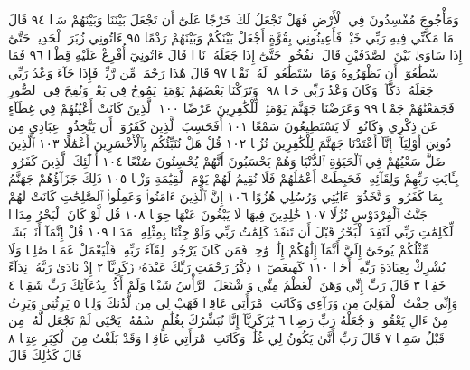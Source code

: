 وَمَأْجُوجَ مُفْسِدُونَ فِي ٱلْأَرْضِ فَهَلْ نَجْعَلُ لَكَ خَرْجًا عَلَىٰٓ أَن
تَجْعَلَ بَيْنَنَا وَبَيْنَهُمْ سَدࣰّا ٩٤ قَالَ مَا مَكَّنِّي فِيهِ رَبِّي خَيْرࣱ فَأَعِينُونِي
بِقُوَّةٍ أَجْعَلْ بَيْنَكُمْ وَبَيْنَهُمْ رَدْمًا ٩٥ ءَاتُونِي زُبَرَ ٱلْحَدِيدِۖ حَتَّىٰٓ إِذَا سَاوَىٰ
بَيْنَ ٱلصَّدَفَيْنِ قَالَ ٱنفُخُوا۟ۖ حَتَّىٰٓ إِذَا جَعَلَهُۥ نَارࣰا قَالَ ءَاتُونِيٓ أُفْرِغْ عَلَيْهِ
قِطْرࣰا ٩٦ فَمَا ٱسْطَٰعُوٓا۟ أَن يَظْهَرُوهُ وَمَا ٱسْتَطَٰعُوا۟ لَهُۥ نَقْبࣰا ٩٧
قَالَ هَٰذَا رَحْمَةࣱ مِّن رَّبِّيۖ فَإِذَا جَآءَ وَعْدُ رَبِّي جَعَلَهُۥ دَكَّآءَۖ وَكَانَ وَعْدُ رَبِّي
حَقࣰّا ٩٨۞ وَتَرَكْنَا بَعْضَهُمْ يَوْمَئِذࣲ يَمُوجُ فِي بَعْضࣲۖ وَنُفِخَ فِي ٱلصُّورِ
فَجَمَعْنَٰهُمْ جَمْعࣰا ٩٩ وَعَرَضْنَا جَهَنَّمَ يَوْمَئِذࣲ لِّلْكَٰفِرِينَ عَرْضًا ١٠٠ ٱلَّذِينَ
كَانَتْ أَعْيُنُهُمْ فِي غِطَآءٍ عَن ذِكْرِي وَكَانُوا۟ لَا يَسْتَطِيعُونَ سَمْعًا ١٠١
أَفَحَسِبَ ٱلَّذِينَ كَفَرُوٓا۟ أَن يَتَّخِذُوا۟ عِبَادِي مِن دُونِيٓ أَوْلِيَآءَۚ إِنَّآ
أَعْتَدْنَا جَهَنَّمَ لِلْكَٰفِرِينَ نُزُلࣰا ١٠٢ قُلْ هَلْ نُنَبِّئُكُم بِٱلْأَخْسَرِينَ أَعْمَٰلًا ١٠٣
ٱلَّذِينَ ضَلَّ سَعْيُهُمْ فِي ٱلْحَيَوٰةِ ٱلدُّنْيَا وَهُمْ يَحْسَبُونَ أَنَّهُمْ يُحْسِنُونَ
صُنْعًا ١٠٤ أُو۟لَٰٓئِكَ ٱلَّذِينَ كَفَرُوا۟ بِـَٔايَٰتِ رَبِّهِمْ وَلِقَآئِهِۦ فَحَبِطَتْ
أَعْمَٰلُهُمْ فَلَا نُقِيمُ لَهُمْ يَوْمَ ٱلْقِيَٰمَةِ وَزْنࣰا ١٠٥ ذَٰلِكَ جَزَآؤُهُمْ جَهَنَّمُ
بِمَا كَفَرُوا۟ وَٱتَّخَذُوٓا۟ ءَايَٰتِي وَرُسُلِي هُزُوًا ١٠٦ إِنَّ ٱلَّذِينَ ءَامَنُوا۟ وَعَمِلُوا۟
ٱلصَّٰلِحَٰتِ كَانَتْ لَهُمْ جَنَّٰتُ ٱلْفِرْدَوْسِ نُزُلًا ١٠٧ خَٰلِدِينَ فِيهَا
لَا يَبْغُونَ عَنْهَا حِوَلࣰا ١٠٨ قُل لَّوْ كَانَ ٱلْبَحْرُ مِدَادࣰا لِّكَلِمَٰتِ رَبِّي لَنَفِدَ
ٱلْبَحْرُ قَبْلَ أَن تَنفَدَ كَلِمَٰتُ رَبِّي وَلَوْ جِئْنَا بِمِثْلِهِۦ مَدَدࣰا ١٠٩ قُلْ إِنَّمَآ
أَنَا۠ بَشَرࣱ مِّثْلُكُمْ يُوحَىٰٓ إِلَيَّ أَنَّمَآ إِلَٰهُكُمْ إِلَٰهࣱ وَٰحِدࣱۖ فَمَن كَانَ يَرْجُوا۟
لِقَآءَ رَبِّهِۦ فَلْيَعْمَلْ عَمَلࣰا صَٰلِحࣰا وَلَا يُشْرِكْ بِعِبَادَةِ رَبِّهِۦٓ أَحَدَۢا ١١٠
كٓهيعٓصٓ ١ ذِكْرُ رَحْمَتِ رَبِّكَ عَبْدَهُۥ زَكَرِيَّآ ٢ إِذْ
نَادَىٰ رَبَّهُۥ نِدَآءً خَفِيࣰّا ٣ قَالَ رَبِّ إِنِّي وَهَنَ ٱلْعَظْمُ مِنِّي
وَٱشْتَعَلَ ٱلرَّأْسُ شَيْبࣰا وَلَمْ أَكُنۢ بِدُعَآئِكَ رَبِّ شَقِيࣰّا ٤
وَإِنِّي خِفْتُ ٱلْمَوَٰلِيَ مِن وَرَآءِي وَكَانَتِ ٱمْرَأَتِي
عَاقِرࣰا فَهَبْ لِي مِن لَّدُنكَ وَلِيࣰّا ٥ يَرِثُنِي وَيَرِثُ مِنْ
ءَالِ يَعْقُوبَۖ وَٱجْعَلْهُ رَبِّ رَضِيࣰّا ٦ يَٰزَكَرِيَّآ إِنَّا
نُبَشِّرُكَ بِغُلَٰمٍ ٱسْمُهُۥ يَحْيَىٰ لَمْ نَجْعَل لَّهُۥ مِن قَبْلُ سَمِيࣰّا ٧
قَالَ رَبِّ أَنَّىٰ يَكُونُ لِي غُلَٰمࣱ وَكَانَتِ ٱمْرَأَتِي عَاقِرࣰا
وَقَدْ بَلَغْتُ مِنَ ٱلْكِبَرِ عِتِيࣰّا ٨ قَالَ كَذَٰلِكَ قَالَ
